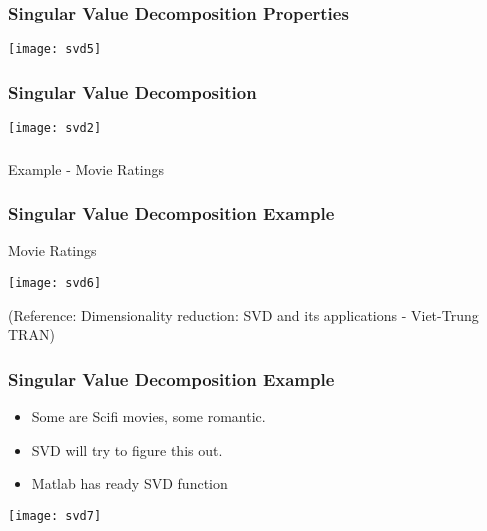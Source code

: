 \begin{frame}[fragile]
\frametitle{Singular Value Decomposition Properties}
\begin{center}
\texttt{[image: svd5]}
\end{center}
\end{frame}



\begin{frame}[fragile]
\frametitle{Singular Value Decomposition}
\begin{center}
\texttt{[image: svd2]}
\end{center}
\end{frame}

\begin{frame}[fragile]\frametitle{}
\begin{center}
{\Large Example - Movie Ratings}
\end{center}
\end{frame}

\begin{frame}[fragile]
\frametitle{Singular Value Decomposition Example}
Movie Ratings
\begin{center}
\texttt{[image: svd6]}
\end{center}
\tiny{(Reference: Dimensionality reduction: SVD and its applications - Viet-Trung TRAN)}
\end{frame}

\begin{frame}[fragile]
\frametitle{Singular Value Decomposition Example}
\begin{itemize}
	\item Some are Scifi movies, some romantic.
	\item SVD will try to figure this out.
	\item Matlab has ready SVD function
\end{itemize}

\begin{center}
\texttt{[image: svd7]}
\end{center}
\end{frame}

